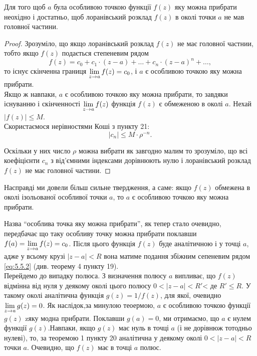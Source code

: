\begin{theorem}
	Для того щоб $a$ була особливою точкою функції $f(z)$ яку можна прибрати неохідно і достатньо, щоб лоранівський розклад $f(z)$ в околі точки $a$ не мав головної частини.
\end{theorem}
\begin{proof}
	Зрозуміло, що якщо лоранівський розклад $f(z)$ не має головної частнии, тобто якщо $f(z)$ подається степеневим рядом
	\begin{equation}
		\label{eq:5.5.2}
		f(z) = c_0 + c_1 \cdot (z - a) + \ldots + c_n \cdot (z - a)^n + \ldots,
	\end{equation}
	то існує скінченна границя $\displaystyle\lim\limits_{z \to a} f(z) = c_0$, і $a$ є особливою точкою яку можна прибрати. \\

	Якщо ж навпаки, $a$ є особливою точкою яку можна прибрати, то завдяки існуванню і скінченності $\displaystyle\lim\limits_{z \to a} f(z)$ функція $f(z)$ є обмеженою в околі $a$. Нехай $|f(z)| \le M$. \\

	Скористаємося нерівностями Коші з пункту 21:
	\begin{equation*}
		|c_n| \le M \cdot \rho^{-n}.
	\end{equation*}

	Оскільки у них число $\rho$ можна вибрати як завгодно малим то зрозуміло, що всі коефіцієнти $c_n$ з від'ємними індексами дорівнюють нулю і лоранівський розклад $f(z)$ не має головної частини.
\end{proof}

\begin{remark*}
	Насправді ми довели більш сильне твердження, а саме: якщо $f(z)$ обмежена в околі ізольованої особливої точки $a$, то $a$ є особливою точкою яку можна прибрати.
\end{remark*}

Назва ``особлива точка яку можна прибрати'', як тепер стало очевидно, передбачає що таку особливу точку можна прибрати поклавши $f(a) = \displaystyle\lim\limits_{z \to a} f(z) = c_0$. Після цього функція $f(z)$ буде аналітичною і у точці $a$, адже у всьому крузі $|z - a| < R$ вона матиме подання збіжним сепеневим рядом \eqref{eq:5.5.2} (див. теорему 4 пункту 19). \\

Перейдемо до випадку полюса. З визначення полюсу $a$ випливає, що $f(z)$ відмінна від нуля у деякому околі цього полюсу $0 < | z - a | < R'$< де $R' \le R$. У такому околі аналітична функція $g(z) = 1 / f(z)$, для якої, очевидно $\displaystyle\lim\limits_{z \to a}g(z) = 0$. Як наслідок,за минулою теоермою, $a$ є особливою точкою функції $g(z)$ zяку модна прибрати. Поклавши $g(a) = 0$, ми отримаємо, що $a$ є нулем функції $g(z)$.Навпаки, якщо $g(z)$ має нуль в точці $a$ (і не дорівнюж тотодньо нулеві), то, за теоремою 1 пункту 20 аналітична у деякому околі $0 < |z - a| < R$ точки $a$. Очевидно, що $f(z)$ має в точці $a$ полюс. \\

